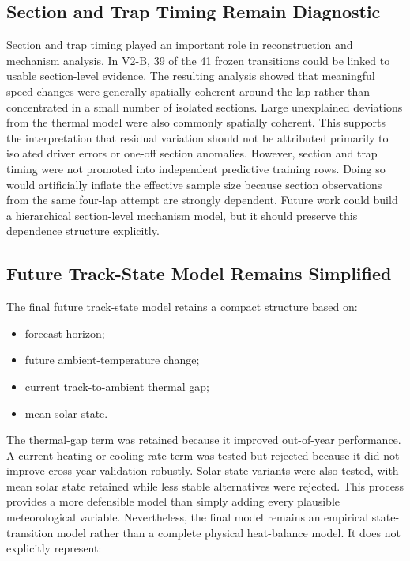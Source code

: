 \subsection{Section and Trap Timing Remain Diagnostic}
Section and trap timing played an important role in reconstruction and mechanism analysis. In V2-B, 39 of the 41 frozen transitions could be linked to usable section-level evidence. The resulting analysis showed that meaningful speed changes were generally spatially coherent around the lap rather than concentrated in a small number of isolated sections. Large unexplained deviations from the thermal model were also commonly spatially coherent. This supports the interpretation that residual variation should not be attributed primarily to isolated driver errors or one-off section anomalies. However, section and trap timing were not promoted into independent predictive training rows. Doing so would artificially inflate the effective sample size because section observations from the same four-lap attempt are strongly dependent. Future work could build a hierarchical section-level mechanism model, but it should preserve this dependence structure explicitly.

\subsection{Future Track-State Model Remains Simplified}
The final future track-state model retains a compact structure based on:

\begin{itemize}
\item forecast horizon;
\item future ambient-temperature change;
\item current track-to-ambient thermal gap;
\item mean solar state.
\end{itemize}

The thermal-gap term was retained because it improved out-of-year performance. A current heating or cooling-rate term was tested but rejected because it did not improve cross-year validation robustly. Solar-state variants were also tested, with mean solar state retained while less stable alternatives were rejected. This process provides a more defensible model than simply adding every plausible meteorological variable. Nevertheless, the final model remains an empirical state-transition model rather than a complete physical heat-balance model. It does not explicitly represent:

